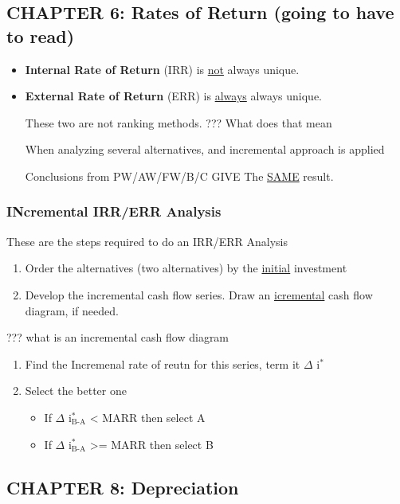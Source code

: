 \documentclass[11pt]{article}
\begin{document}
\subsection{CHAPTER 6: Rates of Return (going to have to read)}
\label{sec:orgheadline8}

\begin{itemize}
\item \textbf{Internal Rate of Return} (IRR) is \uline{not} always unique.
\item \textbf{External Rate of Return} (ERR) is \uline{always} always unique.

These two are not ranking methods.   ??? What does that mean

When analyzing several alternatives, and incremental approach is applied

Conclusions from PW/AW/FW/B/C GIVE The \uline{SAME} result.
\end{itemize}

\subsubsection{INcremental IRR/ERR Analysis}
\label{sec:orgheadline7}
These are the steps required to do an IRR/ERR Analysis

\begin{enumerate}
\item Order the alternatives (two alternatives) by the \uline{initial} investment

\item Develop the incremental cash flow series. Draw an \uline{icremental} cash flow diagram, if needed.
\end{enumerate}


??? what is an incremental cash flow diagram

\begin{enumerate}
\item Find the Incremenal rate of reutn for this series, term it \(\Delta\) i\(^{\text{*}}\)

\item Select the better one
\begin{itemize}
\item If \(\Delta\) i\(^{\text{*}}_{\text{B-A}}\) < MARR then select A
\item If \(\Delta\) i\(^{\text{*}}_{\text{B-A}}\) >= MARR then select B
\end{itemize}
\end{enumerate}

\subsection{CHAPTER 8: Depreciation}
\label{sec:orgheadline13}
\end{document}
